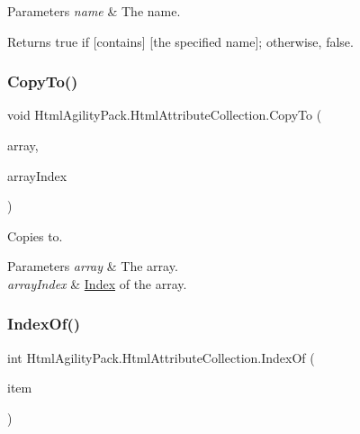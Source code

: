 \begin{DoxyParams}{Parameters}
{\em name} & The name.\\
\hline
\end{DoxyParams}
\begin{DoxyReturn}{Returns}
{\ttfamily true} if \mbox{[}contains\mbox{]} \mbox{[}the specified name\mbox{]}; otherwise, {\ttfamily false}.
\end{DoxyReturn}
\mbox{\label{class_html_agility_pack_1_1_html_attribute_collection_ae6f38d0cbc217187f623dd844be9847b}} 
\subsubsection{\texorpdfstring{Copy\+To()}{CopyTo()}}
{\footnotesize\ttfamily void Html\+Agility\+Pack.\+Html\+Attribute\+Collection.\+Copy\+To (\begin{DoxyParamCaption}\item[{\hyperlink{class_html_agility_pack_1_1_html_attribute}{Html\+Attribute} \mbox{[}$\,$\mbox{]}}]{array,  }\item[{int}]{array\+Index }\end{DoxyParamCaption})\hspace{0.3cm}{\ttfamily [inline]}}



Copies to. 


\begin{DoxyParams}{Parameters}
{\em array} & The array.\\
\hline
{\em array\+Index} & \hyperlink{class_index}{Index} of the array.\\
\hline
\end{DoxyParams}
\mbox{\label{class_html_agility_pack_1_1_html_attribute_collection_a752ef23fb3e6d7e1dc77c343c13a8be2}} 
\subsubsection{\texorpdfstring{Index\+Of()}{IndexOf()}}
{\footnotesize\ttfamily int Html\+Agility\+Pack.\+Html\+Attribute\+Collection.\+Index\+Of (\begin{DoxyParamCaption}\item[{\hyperlink{class_html_agility_pack_1_1_html_attribute}{Html\+Attribute}}]{item }\end{DoxyParamCaption})\hspace{0.3cm}{\ttfamily [inline]}}



